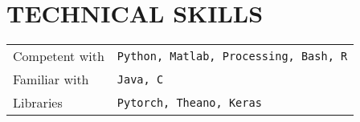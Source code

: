 \section{TECHNICAL SKILLS}
\begin{tabular}{ll}
Competent with & \texttt{Python, Matlab, Processing, Bash, R}\\
Familiar with & \texttt{Java, C}\\
Libraries & \texttt{Pytorch, Theano, Keras}\\
\end{tabular}
